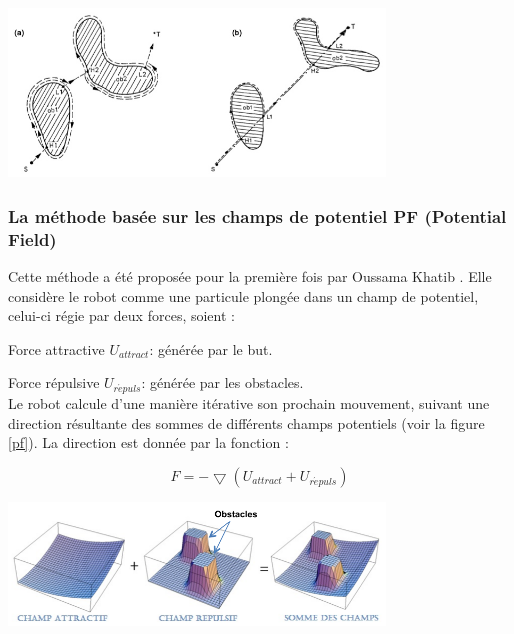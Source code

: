 \begin{center}	  
	\includegraphics[width=0.75\textwidth]{../Figures/Bug.jpg}%
	\vspace{-0.1 cm}
	\label{bug}%
\end{center}

\subsubsection{La méthode basée sur les champs de potentiel PF (Potential Field) \cite{Sara}}
Cette méthode a été proposée pour la première fois par Oussama Khatib \cite{Khatib}. Elle considère le robot comme une particule plongée dans un champ de potentiel, celui-ci régie par deux forces, soient : 

Force attractive $U_{attract}$: générée par le but.

Force répulsive $U_{r\acute{e}puls}$: générée par les obstacles.\\

Le robot calcule d’une manière itérative son prochain mouvement, suivant une direction résultante des sommes de différents champs potentiels (voir la figure \ref{pf}). La direction est donnée par la fonction :
 
\begin{equation}
F = - \bigtriangledown (U_{attract} + U_{r\acute{e}puls})
\end{equation}


\begin{center}	  
	\includegraphics[width=0.75\textwidth]{../Figures/FP.png}%
	\vspace{-0.1 cm}
	\label{pf}%
\end{center}
	

